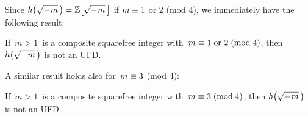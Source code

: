 Since $\hhm{m} = \ZZM{m}$ if $m \equiv 1$ or $2$ (mod $4$),
we immediately have the following result:

\begin{cor}\label{m_neg_composite_implies_not_uniqueness_2}
If\, $m > 1$\, is a composite squarefree integer with\,
\mbox{$m \equiv 1\; \textrm{or}\ 2\;\mathrm{(mod\;4)}$,}
then $\hhm{m}$ is not an UFD.
\end{cor}

A similar result holds also for\, $m \equiv 3$ (mod $4$):
\begin{thm}\label{m_neg_composite_implies_not_uniqueness_3}
If\, $m > 1$\, is a composite squarefree integer with\,
\mbox{$m \equiv 3\;\mathrm{(mod\;4)}$,} then $\hhm{m}$ is
not an UFD.
\end{thm}


